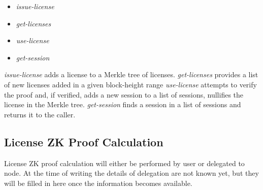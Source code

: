 \begin{itemize}%
	\item \textit{issue-license}
	\item \textit{get-licenses}
	\item \textit{use-license}
	\item \textit{get-session}
\end{itemize}


\begin{flushleft}
\textit{issue-license} adds a license to a Merkle tree of licenses. \textit{get-licenses} provides a list of new licenses added in a given block-height range \textit{use-license} attempts to verify the proof and, if verified, adds a new session to a list of sessions, nullifies the license in the Merkle tree. \textit{get-session} finds a session in a list of sessions and returns it to the caller.
\end{flushleft}

\subsection{License ZK Proof Calculation}

License ZK proof calculation will either be performed by user or delegated to node. At the time of writing the details of delegation are not known yet, but they will be filled in here once the information becomes available.
